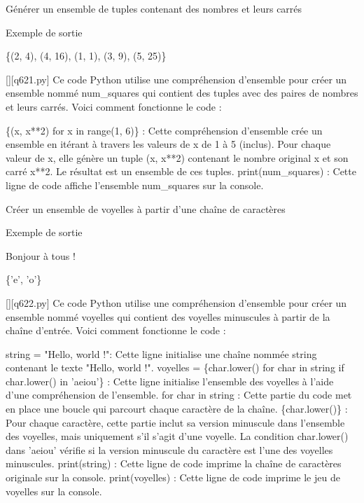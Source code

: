         \question
        Générer un ensemble de tuples contenant des nombres et leurs carrés

Exemple de sortie

\{(2, 4), (4, 16), (1, 1), (3, 9), (5, 25)\}
        \par
        \begin{solution}
            \renewcommand{\nomfichier}{q621.py}
            \pythonfile{\chemincode \nomfichier}[][\nomfichier]
            Ce code Python utilise une compréhension d'ensemble pour créer un ensemble nommé num\_squares qui contient des tuples avec des paires de nombres et leurs carrés. Voici comment fonctionne le code :

    \{(x, x**2) for x in range(1, 6)\} : Cette compréhension d'ensemble crée un ensemble en itérant à travers les valeurs de x de 1 à 5 (inclus). Pour chaque valeur de x, elle génère un tuple (x, x**2) contenant le nombre original x et son carré x**2. Le résultat est un ensemble de ces tuples.
    print(num\_squares) : Cette ligne de code affiche l'ensemble num\_squares sur la console.
        \end{solution}
        

        \question
        Créer un ensemble de voyelles à partir d'une chaîne de caractères

Exemple de sortie

Bonjour à tous !

\{'e', 'o'\}
        \par
        \begin{solution}
            \renewcommand{\nomfichier}{q622.py}
            \pythonfile{\chemincode \nomfichier}[][\nomfichier]
            Ce code Python utilise une compréhension d'ensemble pour créer un ensemble nommé voyelles qui contient des voyelles minuscules à partir de la chaîne d'entrée. Voici comment fonctionne le code :

    string = "Hello, world !": Cette ligne initialise une chaîne nommée string contenant le texte "Hello, world !".
    voyelles = \{char.lower() for char in string if char.lower() in 'aeiou'\} : Cette ligne initialise l'ensemble des voyelles à l'aide d'une compréhension de l'ensemble.
        for char in string : Cette partie du code met en place une boucle qui parcourt chaque caractère de la chaîne.
        \{char.lower()\} : Pour chaque caractère, cette partie inclut sa version minuscule dans l'ensemble des voyelles, mais uniquement s'il s'agit d'une voyelle. La condition char.lower() dans 'aeiou' vérifie si la version minuscule du caractère est l'une des voyelles minuscules.
    print(string) : Cette ligne de code imprime la chaîne de caractères originale sur la console.
    print(voyelles) : Cette ligne de code imprime le jeu de voyelles sur la console.
        \end{solution}
        


